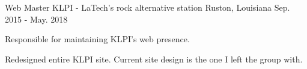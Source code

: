 

\begin{cventries}

  \cventry
    {Web Master} %
    {KLPI - LaTech's rock alternative station} %
    {Ruston, Louisiana} %
    {Sep. 2015 - May. 2018} %
    {
      \begin{cvitems} %
        \item {Responsible for maintaining KLPI's web presence.}
        \item {Redesigned entire KLPI site. Current site design is the one I left the group with.}
      \end{cvitems}
    }

\end{cventries}
